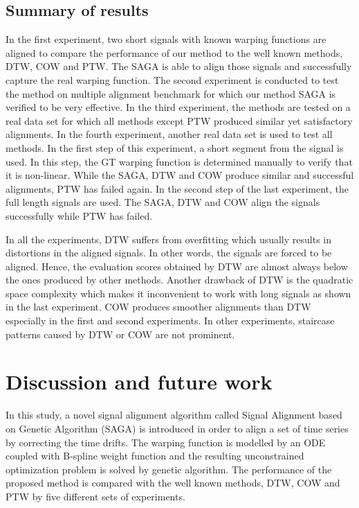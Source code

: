 \documentclass[number,1p,12pt]{elsarticle}
\begin{document}
\subsection{Summary of results}
In the first experiment, two short signals with known warping functions are aligned to compare the performance of our method to the well known methods, DTW, COW and PTW. The SAGA is able to align those signals and successfully capture the real warping function.  The second experiment is conducted to test the method on multiple alignment benchmark for which our method SAGA is verified to be very effective. In the third experiment, the methods are tested on a real data set for which all methods except PTW produced similar yet satisfactory alignments. In the fourth experiment, another real data set is used to test all methods. In the first step of this experiment, a short segment from the signal is used. In this step, the GT warping function is determined manually to verify that it is non-linear.  While the SAGA, DTW and COW produce similar and successful alignments, PTW has failed again. In the second step of the last experiment, the full length signals are used. The SAGA, DTW and COW align the signals successfully while PTW has failed.

In all the experiments, DTW suffers from overfitting which usually results in distortions in the aligned signals. In other words, the signals are forced to be aligned. Hence, the  evaluation scores obtained by DTW are almost always below the ones produced by other methods. Another drawback of DTW is the quadratic space complexity which makes it inconvenient to work with long signals as shown in the last experiment. COW produces smoother alignments than DTW especially in the first and second experiments. In other experiments, staircase patterns caused by DTW or COW are not prominent. 

\section{Discussion and future work}
In this study, a novel signal alignment algorithm called Signal Alignment based on Genetic Algorithm (SAGA) is introduced in order to align a set of time series by correcting the time drifts. The warping function is modelled by an ODE coupled with B-spline weight function and the resulting unconstrained optimization problem is solved by genetic algorithm. The performance of the proposed method is compared with the well known methods, DTW, COW and PTW by five different sets of experiments. 
\end{document}
